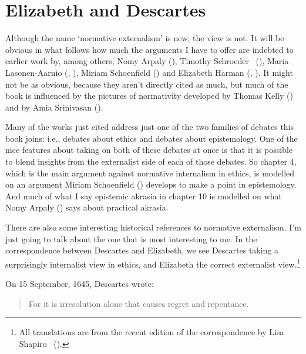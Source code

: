 \documentclass[
  10pt,
  letterpaper,
  twoside]{scrbook}
\begin{document}
\section{Elizabeth and Descartes}\label{elizabethanddescartes}

Although the name `normative externalism' is new, the view is not. It
will be obvious in what follows how much the arguments I have to offer
are indebted to earlier work by, among others, Nomy Arpaly
(), Timothy Schroeder
~(), Maria
Lasonen-Aarnio (,
), Miriam Schoenfield
() and Elizabeth Harman
(, ). It
might not be as obvious, because they aren't directly cited as much, but
much of the book is influenced by the pictures of normativity developed
by Thomas Kelly () and by Amia Srinivasan
().

Many of the works just cited address just one of the two families of
debates this book joins: i.e., debates about ethics and debates about
epistemology. One of the nice features about taking on both of these
debates at once is that it is possible to blend insights from the
externalist side of each of those debates. So chapter 4, which is the
main argument against normative internalism in ethics, is modelled on an
argument Miriam Schoenfield ()
develops to make a point in epistemology. And much of what I say
epistemic akrasia in chapter 10 is modelled on what Nomy Arpaly
() says about practical akrasia.

There are also some interesting historical references to normative
externalism. I'm just going to talk about the one that is most
interesting to me. In the correspondence between Descartes and
Elizabeth, we see Descartes taking a surprisingly internalist view in
ethics, and Elizabeth the correct externalist view.\footnote{All
  translations are from the recent edition of the correspondence by Lisa
  Shapiro ~().}

On 15 September, 1645, Descartes wrote:

\begin{quote}
For it is irresolution alone that causes regret and repentance.
\end{quote}
\end{document}
